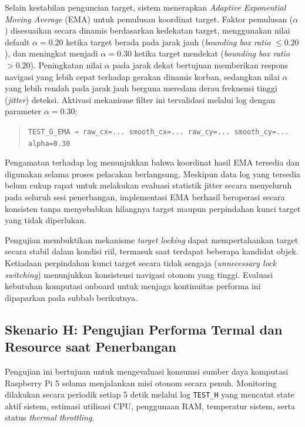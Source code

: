 Selain kestabilan penguncian target, sistem menerapkan \textit{Adaptive Exponential Moving Average} (EMA) untuk pemulusan koordinat target. Faktor pemulusan ($\alpha$) disesuaikan secara dinamis berdasarkan kedekatan target, menggunakan nilai default $\alpha = 0.20$ ketika target berada pada jarak jauh (\textit{bounding box ratio} $\le 0.20$), dan meningkat menjadi $\alpha = 0.30$ ketika target mendekat (\textit{bounding box ratio} $> 0.20$). Peningkatan nilai $\alpha$ pada jarak dekat bertujuan memberikan respons navigasi yang lebih cepat terhadap gerakan dinamis korban, sedangkan nilai $\alpha$ yang lebih rendah pada jarak jauh berguna meredam derau frekuensi tinggi (\textit{jitter}) deteksi. Aktivasi mekanisme filter ini tervalidasi melalui log dengan parameter $\alpha = 0.30$:

\begin{quote}\footnotesize
	\texttt{TEST\_G\_EMA → raw\_cx=... smooth\_cx=... raw\_cy=... smooth\_cy=... alpha=0.30}
\end{quote}

Pengamatan terhadap log menunjukkan bahwa koordinat hasil EMA tersedia dan digunakan selama proses pelacakan berlangsung. Meskipun data log yang tersedia belum cukup rapat untuk melakukan evaluasi statistik jitter secara menyeluruh pada seluruh sesi penerbangan, implementasi EMA berhasil beroperasi secara konsisten tanpa menyebabkan hilangnya target maupun perpindahan kunci target yang tidak diperlukan.

Pengujian membuktikan mekanisme \textit{target locking} dapat mempertahankan target secara stabil dalam kondisi riil, termasuk saat terdapat beberapa kandidat objek. Ketiadaan perpindahan kunci target secara tidak sengaja (\textit{unnecessary lock switching}) menunjukkan konsistensi navigasi otonom yang tinggi. Evaluasi kebutuhan komputasi onboard untuk menjaga kontinuitas performa ini dipaparkan pada subbab berikutnya.

\subsection{Skenario H: Pengujian Performa Termal dan Resource saat Penerbangan}

Pengujian ini bertujuan untuk mengevaluasi konsumsi sumber daya komputasi Raspberry Pi 5 selama menjalankan misi otonom secara penuh. Monitoring dilakukan secara periodik setiap 5 detik melalui log \texttt{TEST\_H} yang mencatat state aktif sistem, estimasi utilisasi CPU, penggunaan RAM, temperatur sistem, serta status \textit{thermal throttling}.

